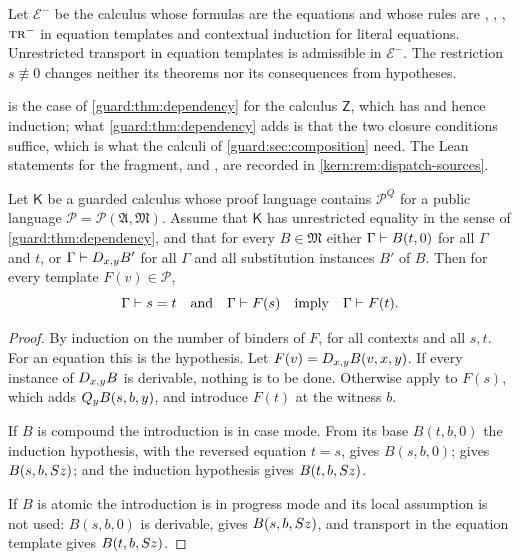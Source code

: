 \begin{corollary}
\label{guard:cor:eminus}
Let $\mathcal E^{-}$ be the calculus whose formulas are the equations and
whose rules are , , ,
$\rulename{Tr}^{-}$ in equation templates and contextual induction for
literal equations.  Unrestricted transport in equation templates is
admissible in $\mathcal E^{-}$.  The restriction $s\not\equiv 0$ changes
neither its theorems nor its consequences from hypotheses.
\end{corollary}

 is the case of \cref{guard:thm:dependency} for the
calculus $\mathsf Z$, which has  and hence induction; what
\cref{guard:thm:dependency} adds is that the two closure conditions
suffice, which is what the calculi of \cref{guard:sec:composition} need.
The Lean statements for the fragment,  and
, are recorded in \cref{kern:rem:dispatch-sources}.

\begin{proposition}
\label{guard:prop:pubtr}
Let $\mathsf K$ be a guarded calculus whose proof language contains
$\mathcal P^{Q}$ for a public language
$\mathcal P=\mathcal P(\mathfrak A,\mathfrak M)$.  Assume that $\mathsf K$
has unrestricted equality in the sense of \cref{guard:thm:dependency}, and
that for every $B\in\mathfrak M$ either $\Gamma\vdash B(t,0)$ for all
$\Gamma$ and $t$, or $\Gamma\vdash D_{x,y}B'$ for all $\Gamma$ and all
substitution instances $B'$ of $B$.  Then for every template
$F(v)\in\mathcal P$,
\[
 \Gamma\vdash s=t\quad\text{and}\quad\Gamma\vdash F(s)
 \quad\text{imply}\quad\Gamma\vdash F(t).
\]
\end{proposition}

\begin{proof}
By induction on the number of binders of $F$, for all contexts and all
$s,t$.  For an equation this is the hypothesis.  Let
$F(v)=D_{x,y}B(v,x,y)$.  If every instance of $D_{x,y}B$ is derivable,
nothing is to be done.  Otherwise apply  to $F(s)$, which adds
$Q_{y}B(s,b,y)$, and introduce $F(t)$ at the witness $b$.

If $B$ is compound the introduction is in case mode.  From its base
$B(t,b,0)$ the induction hypothesis, with the reversed equation $t=s$, gives
$B(s,b,0)$;  gives $B(s,b,S z)$; and the induction
hypothesis gives $B(t,b,S z)$.

If $B$ is atomic the introduction is in progress mode and its local
assumption is not used: $B(s,b,0)$ is derivable,  gives
$B(s,b,S z)$, and transport in the equation template gives
$B(t,b,S z)$.
\end{proof}

